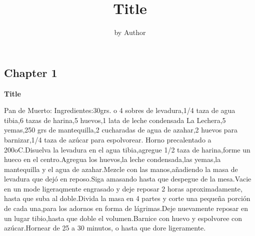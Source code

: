 \documentclass[8pt]{article}
\newcommand{\chapter}[2]{\begin{center}\section*{#1}\textbf{#2}\end{center}}
\begin{document}
\title{Title}
\author{by Author}
\date{}
\maketitle
\newpage

\newpage
\chapter{Chapter 1}{Title}
Pan de Muerto: Ingredientes:30grs. o 4 sobres de levadura,1/4 taza de agua tibia,6 tazas de harina,5 huevos,1 lata de leche condensada La Lechera,5 yemas,250 grs de mantequilla,2 cucharadas de agua de azahar,2 huevos para barnizar,1/4 taza de azúcar para espolvorear. Horno precalentado a 200oC.Disuelva la levadura en el agua tibia,agregue 1/2 taza de harina,forme un hueco en el centro.Agregua los huevos,la leche condensada,las yemas,la mantequilla y el agua de azahar.Mezcle con las manos,añadiendo la masa de levadura que dejó en reposo.Siga amasando hasta que despegue de la mesa.Vacie en un mode ligeraqmente engrasado y deje reposar 2 horas aproximadamente, hasta que suba al doble.Divida la masa en 4 partes y corte una pequeña porción de cada una,para los adornos en forma de lágrimas.Deje nuevamente reposar en un lugar tibio,hasta que doble el volumen.Barnice con huevo y espolvoree con azúcar.Hornear de 25 a 30 minutos, o hasta que dore ligeramente.
\end{document}
